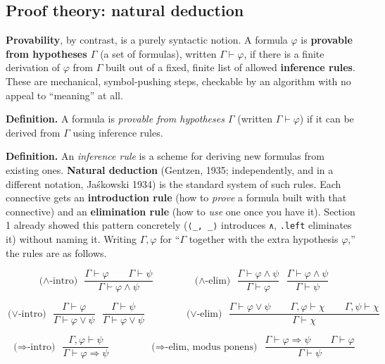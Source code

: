 \subsection{Proof theory: natural deduction}\label{sec:04-propositions-and-proofs:02-logic-recap:4}

\textbf{Provability}, by contrast, is a purely syntactic notion. A formula \(\varphi\) is \textbf{provable from hypotheses \(\Gamma\)} (a set of formulas), written \(\Gamma \vdash \varphi\), if there is a finite derivation of \(\varphi\) from \(\Gamma\) built out of a fixed, finite list of allowed \textbf{inference rules}. These are mechanical, symbol-pushing steps, checkable by an algorithm with no appeal to ``meaning'' at all.

\textbf{Definition.} A formula is \emph{provable from hypotheses \(\Gamma\)} (written \(\Gamma \vdash \varphi\)) if it can be derived from \(\Gamma\) using inference rules.

\textbf{Definition.} An \emph{inference rule} is a scheme for deriving new formulas from existing ones. \textbf{Natural deduction} (Gentzen, 1935; independently, and in a different notation, Jaśkowski 1934) is the standard system of such rules. Each connective gets an \textbf{introduction rule} (how to \emph{prove} a formula built with that connective) and an \textbf{elimination rule} (how to \emph{use} one once you have it). Section 1 already showed this pattern concretely (\texttt{⟨\_\allowbreak{}, \_\allowbreak{}⟩} introduces \texttt{∧}, \texttt{.left} eliminates it) without naming it. Writing \(\Gamma, \varphi\) for ``\(\Gamma\) together with the extra hypothesis \(\varphi\),'' the rules are as follows.

\[
\text{($\wedge$-intro)}\ \ \frac{\Gamma \vdash \varphi \qquad \Gamma \vdash \psi}
{\Gamma \vdash \varphi \wedge \psi}
\qquad\qquad
\text{($\wedge$-elim)}\ \ \frac{\Gamma \vdash \varphi \wedge \psi}{\Gamma \vdash \varphi}
\ \ \ \frac{\Gamma \vdash \varphi \wedge \psi}{\Gamma \vdash \psi}
\]

\[
\text{($\vee$-intro)}\ \ \frac{\Gamma \vdash \varphi}{\Gamma \vdash \varphi \vee \psi}
\ \ \ \frac{\Gamma \vdash \psi}{\Gamma \vdash \varphi \vee \psi}
\qquad\qquad
\text{($\vee$-elim)}\ \ \frac{\Gamma \vdash \varphi \vee \psi \qquad \Gamma, \varphi \vdash \chi \qquad \Gamma, \psi \vdash \chi}{\Gamma \vdash \chi}
\]

\[
\text{($\Rightarrow$-intro)}\ \ \frac{\Gamma, \varphi \vdash \psi}{\Gamma \vdash \varphi \Rightarrow \psi}
\qquad\qquad
\text{($\Rightarrow$-elim, modus ponens)}\ \ \frac{\Gamma \vdash \varphi \Rightarrow \psi \qquad \Gamma \vdash \varphi}{\Gamma \vdash \psi}
\]

